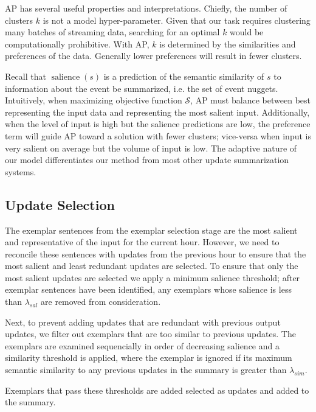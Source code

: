 
AP has several useful properties and interpretations. Chiefly, the number
of clusters $k$ is not a model hyper-parameter. Given that our task requires
clustering many batches of streaming data, searching for an optimal $k$ 
would be computationally prohibitive. With AP, $k$ is determined by the
similarities and preferences of the data. Generally lower preferences will
result in fewer clusters.  


Recall that $\operatorname{salience}(s)$
is a prediction of the semantic similarity of $s$ to information about the 
event be summarized, i.e. the set of event nuggets.
Intuitively, when maximizing objective function $\mathcal{S}$, AP must balance
between best representing the input data and representing the most salient
input. Additionally, when the level of input is high but the salience
predictions are low, the preference term will guide AP toward a solution
with fewer clusters; vice-versa when input is very salient on average but
the volume of input is low. The adaptive nature of our model differentiates
our method from most other update summarization systems.




\subsection{Update Selection}
\label{sec:upsel}

The exemplar sentences from the exemplar selection stage are the most 
salient and representative of the input for the current hour. However,
we need to reconcile these sentences with updates from the previous hour
to ensure that the most salient and least redundant  updates are selected.
To 
ensure that only the most salient updates are selected we apply a minimum
salience threshold;
after exemplar sentences have been identified, any exemplars whose salience is 
less than $\lambda_{sal}$ are removed from consideration. 

 Next,
to prevent adding updates that are redundant with previous output updates, 
we filter out exemplars
that are too similar to previous updates.
The exemplars are examined
sequencially in order of decreasing salience and  a similarity threshold 
is applied, where the exemplar is ignored if its
maximum semantic similarity to any previous updates in the summary is
greater than $\lambda_{sim}$.

Exemplars that pass these thresholds are added selected as updates and added
to the summary.




